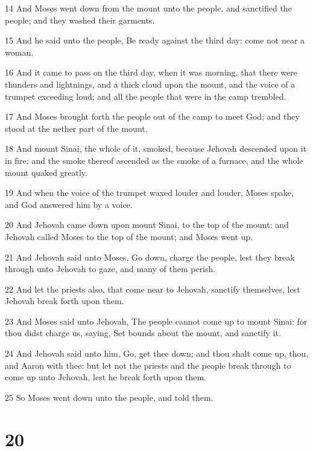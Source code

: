 \par 14 And Moses went down from the mount unto the people, and sanctified the people; and they washed their garments.
\par 15 And he said unto the people, Be ready against the third day: come not near a woman.
\par 16 And it came to pass on the third day, when it was morning, that there were thunders and lightnings, and a thick cloud upon the mount, and the voice of a trumpet exceeding loud; and all the people that were in the camp trembled.
\par 17 And Moses brought forth the people out of the camp to meet God; and they stood at the nether part of the mount.
\par 18 And mount Sinai, the whole of it, smoked, because Jehovah descended upon it in fire; and the smoke thereof ascended as the smoke of a furnace, and the whole mount quaked greatly.
\par 19 And when the voice of the trumpet waxed louder and louder, Moses spake, and God answered him by a voice.
\par 20 And Jehovah came down upon mount Sinai, to the top of the mount: and Jehovah called Moses to the top of the mount; and Moses went up.
\par 21 And Jehovah said unto Moses, Go down, charge the people, lest they break through unto Jehovah to gaze, and many of them perish.
\par 22 And let the priests also, that come near to Jehovah, sanctify themselves, lest Jehovah break forth upon them.
\par 23 And Moses said unto Jehovah, The people cannot come up to mount Sinai: for thou didst charge us, saying, Set bounds about the mount, and sanctify it.
\par 24 And Jehovah said unto him, Go, get thee down; and thou shalt come up, thou, and Aaron with thee: but let not the priests and the people break through to come up unto Jehovah, lest he break forth upon them.
\par 25 So Moses went down unto the people, and told them.

\chapter{20}

